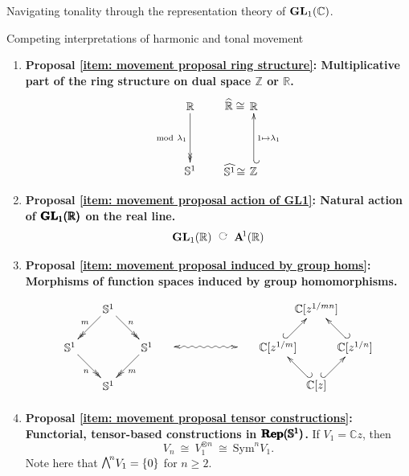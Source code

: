 \documentclass[letterpaper,11pt, reqno]{amsart}
\newtheorem{monodromy theorem}{Monodromy Theorem}[subsection]
\newtheorem{wild conjecture}[theorem]{Wild Conjecture}
\newtheorem{research objectives}{Research objectives}[subsection]
\newtheorem{research question}[theorem]{Research questions}
\newtheorem{aside question}[theorem]{Aside question}
\newtheorem{audio example}[theorem]{\loudspeaker[3] Example}
\newtheorem{blank remark}[theorem]{}
\newtheorem{terminology and comment}[theorem]{Terminology and comment}
\newtheorem{purity hypothesis}[theorem]{Purity hypothesis}
\newtheorem{corollary of the purity hypothesis}[theorem]{Corollary of the purity hypothesis}
\newcommand{\CC} {{\mathbb C}}
\newcommand{\RR} {{\mathbb R}}
\newcommand{\ZZ} {{\mathbb Z}}
\newcommand{\lact}{\ \raisebox{8pt}{\rotatebox{-90}{$\circlearrowright$}}\ }
\numberwithin{equation}{theorem}
\begin{document}
\begin{section}{Navigating tonality through the representation theory of $\bold{GL}_{1}(\CC)$.}
\begin{subsection}{Competing interpretations of harmonic and tonal movement}
\begin{enumerate}
\item\label{item: movement proposal ring structure}
{\bf Proposal \ref{item: movement proposal ring structure}: Multiplicative part of the ring structure on dual space $\pmb{\ZZ}$ or $\pmb{\RR}$.}
	$$
	\begin{xy}
	(0,0)*+{\RR}="1";
	(20,0)*+{\RR}="2";
	(0,-20)*+{\mathbb{S}^{1}}="3";
	(20,-20)*+{\overset{\ }{\ZZ}_{\ }\!\!}="4";
	(14,.6)*+{\widehat{{\RR}}\cong}="5";
	(14,-19.9)*+{\widehat{\mathbb{S}^{1}}\!\cong}="6";
	{\ar@{->>}_{\text{mod}\ \lambda_1} "1"; "3"};
	{\ar@{_{(}->}_{1\mapsto\lambda_1} "4"; "2"};
	\end{xy}
	$$
\item\label{item: movement proposal action of GL1}
{\bf Proposal \ref{item: movement proposal action of GL1}: Natural action of $\pmb{\bold{GL}_1(\RR)}$ on the real line.}
	$$
	\bold{GL}_{1}(\RR)\ \lact\ \bold{A}^{\!1}(\RR)
	$$
\item\label{item: movement proposal induced by group homs}
{\bf Proposal \ref{item: movement proposal induced by group homs}: Morphisms of function spaces induced by group homomorphisms.}
	$$
	\begin{xy}
	(0,0)*+{
	\begin{xy}
	(0,0)*+{\mathbb{S}^{1}}="1";
	(-12,-12)*+{\mathbb{S}^{1}}="2";
	(12,-12)*+{\mathbb{S}^{1}}="3";
	(0,-24)*+{\mathbb{S}^{1}}="4";
	{\ar@{->>}_{m\!\!} "1"; "2"};
	{\ar@{->>}^{\!\!n} "1"; "3"};
	{\ar@{->>}_{n\!\!} "2"; "4"};
	{\ar@{->>}^{\!\!m} "3"; "4"};
	\end{xy}
	\ \ \ \ 
	}="1";
	(60,0)*+{
	\ \ \ \ 
	\begin{xy}
	(0,0)*+{\CC[z^{1/mn}]}="1";
	(-12,-12)*+{\CC[z^{1/m}]}="2";
	(12,-12)*+{\CC[z^{1/n}]}="3";
	(0,-24)*+{\CC[z]}="4";
	{\ar@{^{(}->} "2"; "1"};
	{\ar@{_{(}->} "3"; "1"};
	{\ar@{_{(}->} "4"; "2"};
	{\ar@{^{(}->} "4"; "3"};
	\end{xy}
	}="2";
	{\ar@{<~>} "1"; "2"}
	\end{xy}
	$$
\item\label{item: movement proposal tensor constructions}
{\bf Proposal \ref{item: movement proposal tensor constructions}: Functorial, tensor-based constructions in $\pmb{\bold{Rep}(\mathbb{S}^1)}$.}
	If $V_{1}=\CC z$, then
	$$
	V_{n}\ \cong\ V^{\otimes n}_{1}\ \cong\ \text{Sym}^{n}V_{1}.
	$$
Note here that $\raisebox{1pt}{{{$\bigwedge$}}}^{\!n}V_{1}=\{0\}$ for $n\ge 2$.
\end{enumerate}


\end{subsection}
\end{section}
\end{document}
